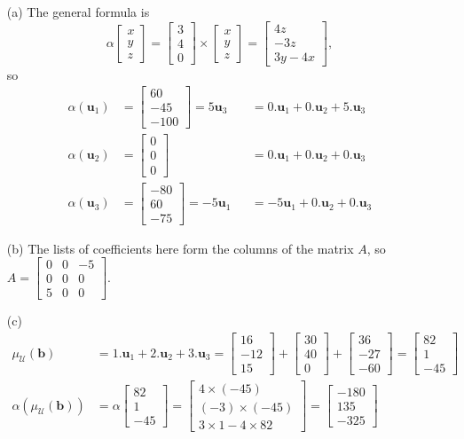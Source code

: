 \documentclass{amsart}
\newcommand{\bsm}       {\left[\begin{smallmatrix}}
\newcommand{\esm}       {\end{smallmatrix}\right]}
\newcommand{\al}        {\alpha}
\newcommand{\tm}        {\times}
\newcommand{\vb}        {\mathbf{b}}
\newcommand{\vu}        {\mathbf{u}}
\newcommand{\CU}        {{\mathcal{U}}}
\renewcommand{\:}       {\colon}
\theoremstyle{definition}
\renewenvironment{solution}{\SolutionAtEnd}{\endSolutionAtEnd}
\begin{document}
\begin{solution}
 \begin{itemize}
  \item[(a)] The general formula is
   \[ \al\bsm x\\ y\\ z\esm=\bsm 3\\4\\0\esm\tm\bsm x\\ y\\ z\esm
       = \bsm 4z\\ -3z\\ 3y-4x\esm,
   \]
   so
   \begin{align*}
    \al(\vu_1) &= \bsm 60\\-45\\-100\esm = 5\vu_3 
               &&= 0.\vu_1 + 0.\vu_2 + 5.\vu_3 \\
    \al(\vu_2) &= \bsm 0\\0\\0\esm 
               &&= 0.\vu_1 + 0.\vu_2 + 0.\vu_3 \\
    \al(\vu_3) &= \bsm -80\\60\\-75\esm = -5\vu_1 
               &&= -5\vu_1+0.\vu_2+0.\vu_3
   \end{align*}
  \item[(b)]
   The lists of coefficients here form the columns of the
   matrix $A$, so $A=\bsm 0&0&-5\\ 0&0&0\\ 5&0&0\esm$.
  \item[(c)]
   \begin{align*}
    \mu_\CU(\vb) &= 1.\vu_1 + 2.\vu_2 + 3.\vu_3
                  = \bsm 16\\ -12\\ 15\esm + 
                    \bsm 30\\ 40\\ 0\esm +
                    \bsm 36\\-27\\-60\esm 
                  = \bsm 82\\ 1\\-45\esm \\
    \al(\mu_\CU(\vb)) 
     &= \al\bsm 82\\ 1\\ -45 \esm 
      = \bsm 4\tm (-45) \\ (-3) \tm (-45) \\ 3\tm 1 - 4\tm 82\esm
      = \bsm -180 \\ 135 \\ -325 \esm \\

\end{align*}
\end{itemize}
\end{solution}
\end{document}
